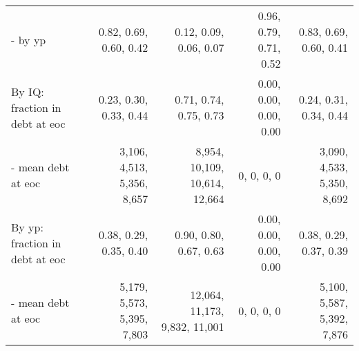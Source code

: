 \begin{tabular}{lrrrr}
- by yp & 0.82, 0.69, 0.60, 0.42  & 0.12, 0.09, 0.06, 0.07  & 0.96, 0.79, 0.71, 0.52  & 0.83, 0.69, 0.60, 0.41  \\
By IQ: fraction in debt at eoc & 0.23, 0.30, 0.33, 0.44  & 0.71, 0.74, 0.75, 0.73  & 0.00, 0.00, 0.00, 0.00  & 0.24, 0.31, 0.34, 0.44  \\
- mean debt at eoc & 3,106, 4,513, 5,356, 8,657  & 8,954, 10,109, 10,614, 12,664  & 0, 0, 0, 0  & 3,090, 4,533, 5,350, 8,692  \\
By yp: fraction in debt at eoc & 0.38, 0.29, 0.35, 0.40  & 0.90, 0.80, 0.67, 0.63  & 0.00, 0.00, 0.00, 0.00  & 0.38, 0.29, 0.37, 0.39  \\
- mean debt at eoc & 5,179, 5,573, 5,395, 7,803  & 12,064, 11,173, 9,832, 11,001  & 0, 0, 0, 0  & 5,100, 5,587, 5,392, 7,876  \\
\hline
\end{tabular}%
